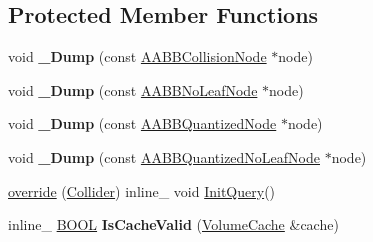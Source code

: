 \subsection*{Protected Member Functions}
\begin{DoxyCompactItemize}
\item 
void {\bfseries \+\_\+\+Dump} (const \hyperlink{classOpcode_1_1AABBCollisionNode}{A\+A\+B\+B\+Collision\+Node} $\ast$node)\hypertarget{classOpcode_1_1VolumeCollider_a4a1027d844da916fdc5deeec7befca73}{}\label{classOpcode_1_1VolumeCollider_a4a1027d844da916fdc5deeec7befca73}

\item 
void {\bfseries \+\_\+\+Dump} (const \hyperlink{classOpcode_1_1AABBNoLeafNode}{A\+A\+B\+B\+No\+Leaf\+Node} $\ast$node)\hypertarget{classOpcode_1_1VolumeCollider_a43205cb40af8570efe91fcf0c096a21d}{}\label{classOpcode_1_1VolumeCollider_a43205cb40af8570efe91fcf0c096a21d}

\item 
void {\bfseries \+\_\+\+Dump} (const \hyperlink{classOpcode_1_1AABBQuantizedNode}{A\+A\+B\+B\+Quantized\+Node} $\ast$node)\hypertarget{classOpcode_1_1VolumeCollider_ac1eaa032cfa22c7f8a3e2f8b8b4522dd}{}\label{classOpcode_1_1VolumeCollider_ac1eaa032cfa22c7f8a3e2f8b8b4522dd}

\item 
void {\bfseries \+\_\+\+Dump} (const \hyperlink{classOpcode_1_1AABBQuantizedNoLeafNode}{A\+A\+B\+B\+Quantized\+No\+Leaf\+Node} $\ast$node)\hypertarget{classOpcode_1_1VolumeCollider_a472f547c9f9fbb7d31c2019775029885}{}\label{classOpcode_1_1VolumeCollider_a472f547c9f9fbb7d31c2019775029885}

\item 
\hyperlink{classOpcode_1_1VolumeCollider_a544bb4d360d67c8f611f7c3bb530d154}{override} (\hyperlink{classOpcode_1_1Collider}{Collider}) inline\+\_\+ void \hyperlink{classOpcode_1_1Collider_af53b15341c03e4cc0cc98342cb9a36d1}{Init\+Query}()
\item 
inline\+\_\+ \hyperlink{IceTypes_8h_a050c65e107f0c828f856a231f4b4e788}{B\+O\+OL} {\bfseries Is\+Cache\+Valid} (\hyperlink{structOpcode_1_1VolumeCache}{Volume\+Cache} \&cache)\hypertarget{classOpcode_1_1VolumeCollider_af4b38b3f7bacb812959d6715469f33d2}{}\label{classOpcode_1_1VolumeCollider_af4b38b3f7bacb812959d6715469f33d2}

\end{DoxyCompactItemize}

